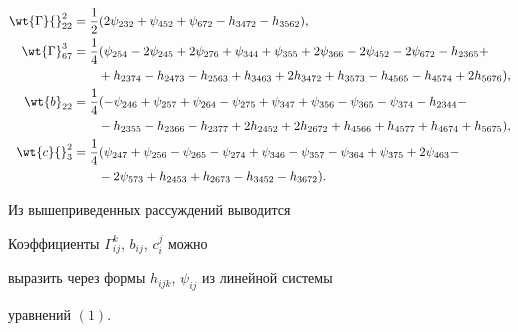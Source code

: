 \begin{align*}


\wt{\Gamma}{}^2_{22}&= \frac{1}{2}(2\psi _{232}+


\psi _{452}+\psi _{672}-h_{3472}-h_{3562}),\\


%


\wt{\Gamma}^3_{67}&= \frac{1}{4} (\psi _{254}-2\psi_{245}+


2 \psi _{276}+\psi _{344}+\psi _{355}+2 \psi _{366}-


2 \psi _{452}-2 \psi _{672}-h_{2365}+ \\


&\qquad +h_{2374}-h_{2473}-h_{2563}+


h_{3463}+2 h_{3472}+h_{3573}-


h_{4565}-h_{4574}+2 h_{5676}),\\


%


\wt{b}_{22}&= \frac{1}{4} (-\psi _{246}+


\psi _{257}+\psi _{264}-\psi _{275}+\psi _{347}


+\psi _{356}-\psi _{365}-\psi _{374}-h_{2344}-\\


&\qquad -h_{2355}-h_{2366}-h_{2377}


+ 2 h_{2452}+2 h_{2672}+h_{4566}+


h_{4577}+h_{4674}+h_{5675}),\\


%


\wt{c}{}_{3}^{2}&= \frac{1}{4} (\psi _{247}+\psi _{256}-


\psi _{265}-\psi _{274}+\psi _{346}-\psi _{357}-\psi _{364}


+ \psi _{375}+2 \psi _{463}-\\


&\qquad -2 \psi _{573}+h_{2453}+


h_{2673}-h_{3452}-h_{3672}).


\end{align*}


Из вышеприведенных рассуждений выводится








\begin{lemnonum}


Коэффициенты $\Gamma^k_{ij}$, $b_{ij}$, $c_{i}^{j}$ можно


выразить через формы $h_{ijk}$, $\psi_{ij}$ из линейной системы


уравнений $(1)$.


\end{lemnonum}








